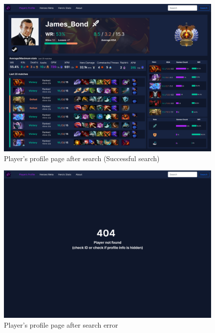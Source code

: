    \begin{figure}[h]
        \centering
        \includegraphics[width=\textwidth]{images/PlayerProfile}
        \caption{Player's profile page after search (Successful search)}
    \end{figure}

    \begin{figure}[h]
        \centering
        \includegraphics[width=\textwidth]{images/PlayerNotFound}
        \caption{Player's profile page after search error}
    \end{figure}


